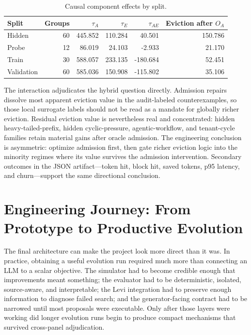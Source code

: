 \documentclass[11pt]{article}
\begin{document}
\begin{table}[H]
\centering
\small
\begin{tabular}{lrrrrr}
\toprule
Split & Groups & \(\tau_A\) & \(\tau_E\) & \(\tau_{AE}\) &
Eviction after \(O_A\) \\
\midrule
Hidden & 60 & 445.852 & 110.284 & 40.501 & 150.786 \\
Probe & 12 & 86.019 & 24.103 & -2.933 & 21.170 \\
Train & 30 & 588.057 & 233.135 & -180.684 & 52.451 \\
Validation & 60 & 585.036 & 150.908 & -115.802 & 35.106 \\
\bottomrule
\end{tabular}
\caption{Causal component effects by split.}
\label{tab:research-causal-by-split}
\end{table}

The interaction adjudicates the hybrid question directly.  Admission repairs dissolve
most apparent eviction value in the audit-labeled counterexamples, so those local
surrogate labels should not be read as a mandate for globally richer eviction.
Residual eviction value is nevertheless real and concentrated: hidden
heavy-tailed-prefix, hidden cyclic-pressure, agentic-workflow, and tenant-cycle
families retain material gains after oracle admission.  The engineering conclusion is
asymmetric: optimize admission first, then gate richer eviction logic into the
minority regimes where its value survives the admission intervention.  Secondary
outcomes in the JSON artifact---token hit, block hit, saved tokens, p95 latency, and
churn---support the same directional conclusion.

\section{Engineering Journey: From Prototype to Productive Evolution}
\label{app:engineering-journey}

The final architecture can make the project look more direct than it was.  In
practice, obtaining a useful evolution run required much more than connecting an LLM
to a scalar objective.  The simulator had to become credible enough that improvements
meant something; the evaluator had to be deterministic, isolated, source-aware, and
interpretable; the Levi integration had to preserve enough information to diagnose
failed search; and the generator-facing contract had to be narrowed until most
proposals were executable.  Only after those layers were working did longer evolution
runs begin to produce compact mechanisms that survived cross-panel adjudication.
\end{document}
